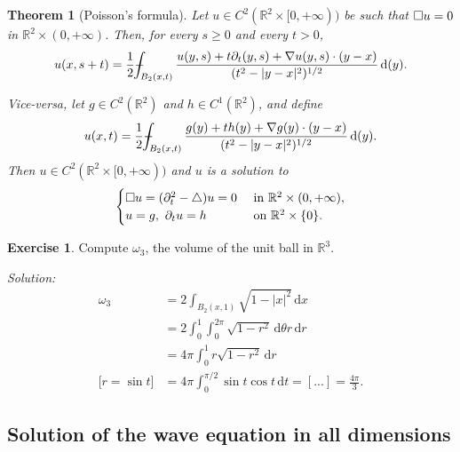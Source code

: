 \documentclass[a4paper,9pt]{amsart}
\newcommand{\R}{\mathbb{R}}	%
\newcommand{\did}{\,\mathrm{d}}	%
\newcommand{\de}{\partial}		%
\newcommand{\laplacian}{\triangle}
\newcommand{\grad}{\nabla}
\def\Xint#1{\mathchoice
      {\XXint\displaystyle\textstyle{#1}}%
      {\XXint\textstyle\scriptstyle{#1}}%
      {\XXint\scriptstyle\scriptscriptstyle{#1}}%
      {\XXint\scriptscriptstyle\scriptscriptstyle{#1}}%
      \!\int}
\def\XXint#1#2#3{{\setbox0=\hbox{$#1{#2#3}{\int}$}
        \vcenter{\hbox{$#2#3$}}\kern-.5\wd0}}
\def\fint{\Xint-}
\theoremstyle{plain}
\newtheorem{theorem}[proposition]{Theorem}
\theoremstyle{definition}
\newtheorem{exercise}[proposition]{Exercise}%
\theoremstyle{remark}
\begin{document}
\begin{theorem}[Poisson's formula]\label{thm67e1265b}
	Let $u\in C^2(\R^2\times[0,+\infty))$ be such that $\square u =0$ in $\R^2\times(0,+\infty)$.
	Then, for every $s\ge 0$ and every $t>0$,
	\begin{equation}\label{eq67e12659}
		u(x,s+t) = \frac12 \fint_{B_2(x,t)} \frac{u(y,s) + t\de_t(y,s) + \grad u(y,s)\cdot (y-x) }{ ( t^2 - |y-x|^2 )^{1/2} } \did (y) .
	\end{equation}
	
	Vice-versa, let $g\in C^2(\R^2)$ and $h\in C^1(\R^2)$, and define
	\begin{equation}\label{eq67d7f537}
		u(x,t) = \frac12 \fint_{B_2(x,t)} \frac{g(y) + th(y) + \grad g(y)\cdot (y-x) }{ ( t^2 - |y-x|^2 )^{1/2} } \did (y) .
	\end{equation}
	Then $u\in C^2(\R^2\times[0,+\infty))$ and $u$ is a solution to 
	\begin{equation}\label{eq67d7f53c}
	\begin{cases}
		\waveop u = ( \de_t^2-\laplacian )u = 0 & \text{ in }\R^2\times(0,+\infty) , \\
		u = g,\ \de_t u = h & \text{ on }\R^2\times\{0\} .
	\end{cases}
	\end{equation}
\end{theorem}


\begin{exercise}
	Compute $\omega_3$, the volume of the unit ball in $\R^3$.
	
	{\it Solution:}
	\begin{align*}
	 	\omega_3
		&= 2\int_{B_2(x,1)} \sqrt{1-|x|^2} \did x \\
		&= 2 \int_0^1 \int_0^{2\pi} \sqrt{1-r^2} \did \theta r \did r \\
		&= 4\pi \int_0^1 r \sqrt{1-r^2} \did r \\
		\text{[$r=\sin t$]}
		&= 4\pi \int_0^{\pi/2} \sin t \cos t \did t
		= [...] = \frac{4\pi}{3} .
	\end{align*}
\end{exercise}

\subsection{Solution of the wave equation in all dimensions}
\end{document}
